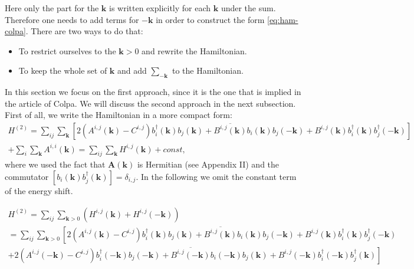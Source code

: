 \documentclass[a4paper,12pt]{article}
\begin{document}
            Here only the part for the $\boldsymbol{k}$ is written explicitly for each $\boldsymbol{k}$ under the sum. 
            Therefore one needs to add terms for $-\boldsymbol{k}$ in order to construct the form \eqref{eq:ham-colpa}. 
            There are two ways to do that:

            \begin{itemize}
                \item To restrict ourselves to the $\boldsymbol{k} > 0$ and rewrite the Hamiltonian.

                \item To keep the whole set of $\boldsymbol{k}$ and add $\sum_{-\boldsymbol{k}}$ to the Hamiltonian.
            \end{itemize}

            In this section we focus on the first approach, since it is the one that is implied in the article of Colpa. 
            We will discuss the second approach in the next subsection.
            First of all, we write the Hamiltonian in a more compact form:
            \begin{multline}
                H^{(2)} = \sum_{ij}\sum_{\boldsymbol{k}}\left[2(A^{i,j}(\boldsymbol{k}) - C^{i,j})b^{\dag}_{i}(\boldsymbol{k})b_{j}(\boldsymbol{k}) + 
                \overline{B^{i,j}(\boldsymbol{k})}b_{i}(\boldsymbol{k})b_{j}(-\boldsymbol{k}) +
                B^{i,j}(\boldsymbol{k})b^{\dag}_{i}(\boldsymbol{k})b^{\dag}_{j}(-\boldsymbol{k})\right]\\
                +\sum_i \sum_{\boldsymbol{k}} A^{i,i}(\boldsymbol{k}) 
                = \sum_{ij}\sum_{\boldsymbol{k}} H^{i,j}(\boldsymbol{k}) 
                + const, \label{eq:ham-simple}
            \end{multline}
            where we used the fact that $\boldsymbol{A}(\boldsymbol{k})$ is Hermitian (see Appendix II) and the commutator $[b_{i}(\boldsymbol{k})b^{\dag}_{j}(\boldsymbol{k})] = \delta_{i,j}$. 
            In the following we omit the constant term of the energy shift. 

            \begin{multline}
                H^{(2)} = \sum_{ij}\sum_{\boldsymbol{k} > 0} \left(H^{i,j}(\boldsymbol{k}) + H^{i,j}(-\boldsymbol{k})\right) \\
                = \sum_{ij}\sum_{\boldsymbol{k} > 0}\left[2(A^{i,j}(\boldsymbol{k}) - C^{i,j})b^{\dag}_{i}(\boldsymbol{k})b_{j}(\boldsymbol{k}) + 
                \overline{B^{i,j}(\boldsymbol{k})}b_{i}(\boldsymbol{k})b_{j}(-\boldsymbol{k}) +
                B^{i,j}(\boldsymbol{k})b^{\dag}_{i}(\boldsymbol{k})b^{\dag}_{j}(-\boldsymbol{k})\right. \\
                +\left.2(A^{i,j}(-\boldsymbol{k}) - C^{i,j})b^{\dag}_{i}(-\boldsymbol{k})b_{j}(-\boldsymbol{k}) + 
                \overline{B^{i,j}(-\boldsymbol{k})}b_{i}(-\boldsymbol{k})b_{j}(\boldsymbol{k}) +
                B^{i,j}(-\boldsymbol{k})b^{\dag}_{i}(-\boldsymbol{k})b^{\dag}_{j}(\boldsymbol{k})\right]
            \end{multline}
\end{document}
